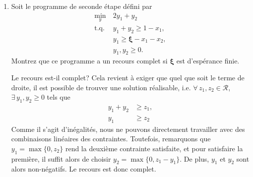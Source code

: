 \documentclass[12pt]{book}
\def\cR {\mathcal{R}}
\def\bxi {\boldsymbol{\xi}}
\newcounter {exercisecount}[section]
\newenvironment {exercise}{}{}%
\begin{document}
\begin{enumerate}
Une telle pénalisation a pour but d'éviter que la résolution du problème maître ne produise une solution de première étape ne tenant pas compte d'un point de départ construit à l'aide d'informations sur le problème à résoudre.
Plus précisément, la pénalisation sert à éviter de produire un point trop éloigné de l'estimation disponible à l'itération courante.

Son principal inconvénient est l'introduction d'un terme quadratique dans l'objectif, rendant le coût de résolution du problème maître plus important que dans l'algorithme L-Shaped classique.
Le coût de résolution des problèmes de seconde étape reste par contre inchangé, et le coût total de résolution du problème est généralement moindre, en particulier lorsque le nombre de scénarios est important, grâce aux gains en termes d'itérations.
La diminution du nombre d'itérations vient d'une propension à construire plus raidement des coupes d'optimalité permettant d'isoler la solution optimale.

Un pas sérieux est obtenu quand la solution du problème maître donne une valeur de la fonction objectif du problème à deux étapes moindre que la valeur obtenue avec l'estimation actuelle de la solution.
Le pas est dit approximatif si des coupes d'optimalité ont été produites au cours de l'itération actuelle (aussi la solution du problème maître ne peut être optimale) et sérieux si aucune coupe d'optimalité n'a été ajoutée au cours de l'itération, de sorte que la solution du problème maître est potentiellement optimale.

\item 

\begin{exercise}
Soit le programme de seconde étape défini par
\begin{align*}
\min_y\ & 2y_1+y_2\\
\mbox{t.q. } & y_1 + y_2 \geq 1-x_1,\\
& y_1 \geq \bxi - x_1-x_2,\\
& y_1, y_2 \geq 0.
\end{align*}
Montrez que ce programme a un recours complet si $\bxi$ est
d'espérance finie.
\end{exercise}

Le recours est-il complet? Cela revient à exiger que quel que soit le terme de droite, il est possible de trouver une solution réalisable, i.e. $\forall\, z_1, z_2 \in \cR$, $\exists\, y_1, y_2 \geq 0$ tels que
\begin{align*}
y_1 + y_2 &\geq z_1,\\
y_1 &\geq z_2
\end{align*}
Comme il s'agit d'inégalités, nous ne pouvons directement travailler avec des combinaisons linéaires des contraintes.
Toutefois, remarquons que $y_1 = \max\{0, z_2\}$ rend la deuxième contrainte satisfaite, et pour satisfaire la première, il suffit alors de choisir $y_2 = \max\{0, z_1 - y_1\}$. De plus, $y_1$ et $y_2$ sont alors non-négatifs. Le recours est donc complet.


\end{enumerate}
\end{document}
